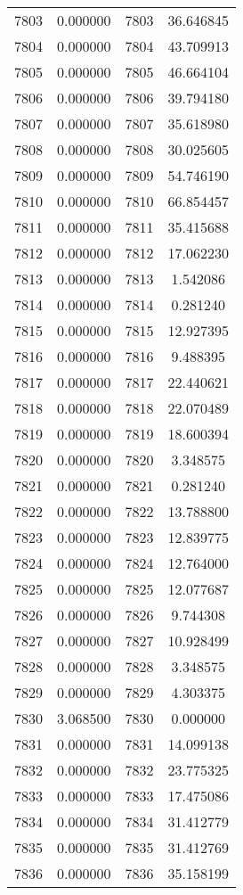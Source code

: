 \documentclass[12pt]{article}
\begin{document}
\begin{longtable}{@{}cccc@{}}
7803 & 0.000000 & 7803 & 36.646845 \\
7804 & 0.000000 & 7804 & 43.709913 \\
7805 & 0.000000 & 7805 & 46.664104 \\
7806 & 0.000000 & 7806 & 39.794180 \\
7807 & 0.000000 & 7807 & 35.618980 \\
7808 & 0.000000 & 7808 & 30.025605 \\
7809 & 0.000000 & 7809 & 54.746190 \\
7810 & 0.000000 & 7810 & 66.854457 \\
7811 & 0.000000 & 7811 & 35.415688 \\
7812 & 0.000000 & 7812 & 17.062230 \\
7813 & 0.000000 & 7813 & 1.542086 \\
7814 & 0.000000 & 7814 & 0.281240 \\
7815 & 0.000000 & 7815 & 12.927395 \\
7816 & 0.000000 & 7816 & 9.488395 \\
7817 & 0.000000 & 7817 & 22.440621 \\
7818 & 0.000000 & 7818 & 22.070489 \\
7819 & 0.000000 & 7819 & 18.600394 \\
7820 & 0.000000 & 7820 & 3.348575 \\
7821 & 0.000000 & 7821 & 0.281240 \\
7822 & 0.000000 & 7822 & 13.788800 \\
7823 & 0.000000 & 7823 & 12.839775 \\
7824 & 0.000000 & 7824 & 12.764000 \\
7825 & 0.000000 & 7825 & 12.077687 \\
7826 & 0.000000 & 7826 & 9.744308 \\
7827 & 0.000000 & 7827 & 10.928499 \\
7828 & 0.000000 & 7828 & 3.348575 \\
7829 & 0.000000 & 7829 & 4.303375 \\
7830 & 3.068500 & 7830 & 0.000000 \\
7831 & 0.000000 & 7831 & 14.099138 \\
7832 & 0.000000 & 7832 & 23.775325 \\
7833 & 0.000000 & 7833 & 17.475086 \\
7834 & 0.000000 & 7834 & 31.412779 \\
7835 & 0.000000 & 7835 & 31.412769 \\
7836 & 0.000000 & 7836 & 35.158199 \\

\end{longtable}
\end{document}
